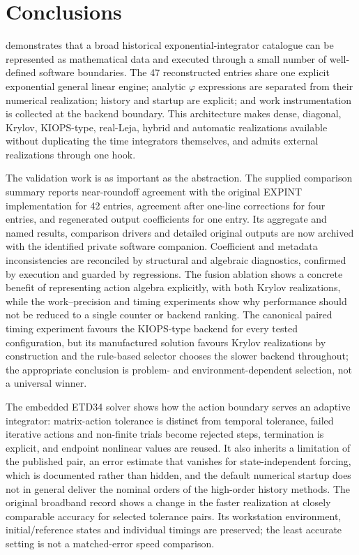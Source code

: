 \section{Conclusions}\label{sec:conclusions}

\pkg{} demonstrates that a broad historical exponential-integrator catalogue
can be represented as mathematical data and executed through a small number of
well-defined software boundaries.  The 47 reconstructed entries share one
explicit exponential general linear engine; analytic $\varphi$ expressions are
separated from their numerical realization; history and startup are explicit;
and work instrumentation is collected at the backend boundary.  This
architecture makes dense, diagonal, Krylov, KIOPS-type, real-Leja, hybrid and
automatic realizations available without duplicating the time integrators
themselves, and admits external realizations through one hook.

The validation work is as important as the abstraction.  The supplied comparison summary reports near-roundoff agreement
with the original EXPINT implementation for 42 entries, agreement after
one-line corrections for four entries, and regenerated output coefficients
for one entry.  Its aggregate and named results, comparison drivers and detailed original
outputs are now archived with the identified private software companion.  Coefficient and metadata inconsistencies are
reconciled by structural and algebraic diagnostics, confirmed by execution and
guarded by regressions.  The fusion ablation shows a concrete benefit of
representing action algebra explicitly, with both Krylov realizations, while
the work--precision and timing experiments show why performance should not be
reduced to a single counter or backend ranking.  The canonical paired timing
experiment favours the KIOPS-type backend for every tested configuration, but
its manufactured solution favours Krylov realizations by construction and the
rule-based selector chooses the slower backend throughout; the appropriate
conclusion is problem- and environment-dependent selection, not a universal
winner.

The embedded ETD34 solver shows how the action boundary serves an adaptive
integrator: matrix-action tolerance is distinct from temporal tolerance,
failed iterative actions and non-finite trials become rejected steps,
termination is explicit, and endpoint nonlinear values are reused.  It also
inherits a limitation of the published pair, an error estimate that vanishes
for state-independent forcing, which is documented rather than hidden, and
the default numerical startup does not in general deliver the nominal orders
of the high-order history methods.  The original broadband record shows a change in the faster realization at
closely comparable accuracy for selected tolerance pairs.  Its workstation
environment, initial/reference states and individual timings are preserved;
the least accurate setting is not a matched-error speed comparison.

